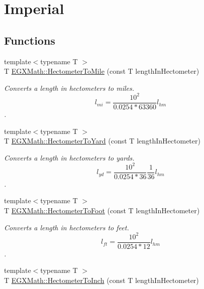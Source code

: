 \hypertarget{group___e_g_x_math-_conversions-_length_conversions-_s_i-_hectometer-_imperial}{}\section{Imperial}
\label{group___e_g_x_math-_conversions-_length_conversions-_s_i-_hectometer-_imperial}
\subsection*{Functions}
\begin{DoxyCompactItemize}
\item 
{\footnotesize template$<$typename T $>$ }\\T \mbox{\hyperlink{group___e_g_x_math-_conversions-_length_conversions-_s_i-_hectometer-_imperial_gabb3930dfb3335dc53303ec8ce9145d71}{E\+G\+X\+Math\+::\+Hectometer\+To\+Mile}} (const T length\+In\+Hectometer)
\begin{DoxyCompactList}\small\item\em Converts a length in hectometers to miles. \[ l_{mi}=\frac{10^{2}}{0.0254 * 63360} l_{hm} \]. \end{DoxyCompactList}\item 
{\footnotesize template$<$typename T $>$ }\\T \mbox{\hyperlink{group___e_g_x_math-_conversions-_length_conversions-_s_i-_hectometer-_imperial_ga84866f087daa74cdd00348f42462d13c}{E\+G\+X\+Math\+::\+Hectometer\+To\+Yard}} (const T length\+In\+Hectometer)
\begin{DoxyCompactList}\small\item\em Converts a length in hectometers to yards. \[ l_{yd}= \frac{10^{2}}{0.0254 * 36} \frac{1}{36} l_{hm} \]. \end{DoxyCompactList}\item 
{\footnotesize template$<$typename T $>$ }\\T \mbox{\hyperlink{group___e_g_x_math-_conversions-_length_conversions-_s_i-_hectometer-_imperial_ga8b57e6e5bef662cc96b8b7dde68659a6}{E\+G\+X\+Math\+::\+Hectometer\+To\+Foot}} (const T length\+In\+Hectometer)
\begin{DoxyCompactList}\small\item\em Converts a length in hectometers to feet. \[ l_{ft}= \frac{10^{2}}{0.0254 * 12} l_{hm} \]. \end{DoxyCompactList}\item 
{\footnotesize template$<$typename T $>$ }\\T \mbox{\hyperlink{group___e_g_x_math-_conversions-_length_conversions-_s_i-_hectometer-_imperial_ga21fd4a7228c229b0b229fd0fab224998}{E\+G\+X\+Math\+::\+Hectometer\+To\+Inch}} (const T length\+In\+Hectometer)

\end{DoxyCompactItemize}
